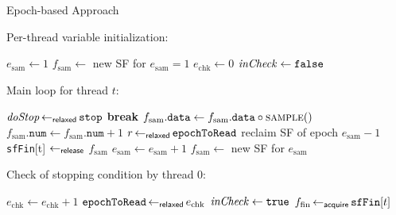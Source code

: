 \begin{algorithm}[t]
\footnotesize
\caption{\footnotesize Epoch-based Approach}
\label{algo:epoch-based-approach}

\begin{minipage}[t]{.48\textwidth}
Per-thread variable initialization:
\begin{algorithmic}
    \State $e_\mathrm{sam} \gets 1$
    \State $f_\mathrm{sam} \gets$ new SF for $e_\mathrm{sam} = 1$
        \State $e_\mathrm{chk} \gets 0$
        \State $\mathit{inCheck} \gets \texttt{false}$
    \EndIf
\end{algorithmic}

Main loop for thread $t$:
\begin{algorithmic}[1]
    \Loop
        \State $\mathit{doStop} \operatorname{\gets_\mathsf{relaxed}} \mathtt{stop}$ \label{line:epoch-based:main-loop}
            \State \textbf{break}
        \EndIf
        \State $f_\mathrm{sam}\mathtt{.data}
            \gets f_\mathrm{sam}\mathtt{.data} \circ \Call{sample}{\null}$
        \State $f_\mathrm{sam}\mathtt{.num}
            \gets f_\mathrm{sam}\mathtt{.num} + 1$
        \State $r \operatorname{\gets_\mathsf{relaxed}} \mathtt{epochToRead}$ \label{line:epoch-based:advance-epoch}
            \State reclaim SF of epoch $e_\mathrm{sam} - 1$ \label{line:epoch:based:reclaim}
            \State \texttt{sfFin}[t] $\operatorname{\gets_\mathsf{release}}$ $f_\mathrm{sam}$ \label{line:epoch-based:publish}
            \State $e_\mathrm{sam} \gets e_\mathrm{sam} + 1$
            \State $f_\mathrm{sam} \gets$ new SF for $e_\mathrm{sam}$ \label{line:epoch-based:new-sf}
        \EndIf
         \label{line:epoch-based:thread-zero-call}
            \State {}
        \EndIf
    \EndLoop
{}
\end{algorithmic}
\end{minipage}\hfill
\begin{minipage}[t]{.48\textwidth}
Check of stopping condition by thread $0$:
\begin{algorithmic}[1]
         \label{line:epoch-based:check-cycle}
            \State $e_\mathrm{chk} \gets e_\mathrm{chk} + 1$
            \State $\mathtt{epochToRead} \operatorname{\gets_\mathsf{relaxed}} e_\mathrm{chk}$
            \State $\mathit{inCheck} \gets \texttt{true}$
        \EndIf
         \label{line:epoch-based:check-frames}
            \State $f_\mathrm{fin} \operatorname{\gets_\mathsf{acquire}} \mathtt{sfFin}[t]$ \label{line:epoch-based:subscribe}

\end{algorithmic}
\end{minipage}
\end{algorithm}
